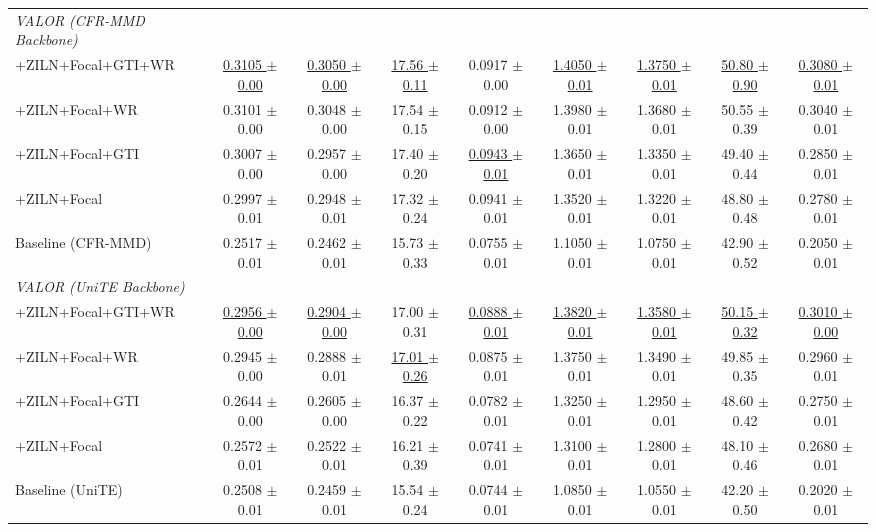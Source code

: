 \documentclass[runningheads]{llncs}
\begin{document}
\begin{table}[t]
{\begin{tabular}{lcccc|cccc}
    \textit{VALOR (CFR-MMD Backbone)} & & & & & & & & \\
    \hspace{3mm}+ZILN+Focal+GTI+WR & \underline{0.3105 $\pm$ 0.00} & \underline{0.3050 $\pm$ 0.00} & \underline{17.56 $\pm$ 0.11} & 0.0917 $\pm$ 0.00 & \underline{1.4050 $\pm$ 0.01} & \underline{1.3750 $\pm$ 0.01} & \underline{50.80 $\pm$ 0.90} & \underline{0.3080 $\pm$ 0.01} \\
    \hspace{3mm}+ZILN+Focal+WR & 0.3101 $\pm$ 0.00 & 0.3048 $\pm$ 0.00 & 17.54 $\pm$ 0.15 & 0.0912 $\pm$ 0.00 & 1.3980 $\pm$ 0.01 & 1.3680 $\pm$ 0.01 & 50.55 $\pm$ 0.39 & 0.3040 $\pm$ 0.01 \\
    \hspace{3mm}+ZILN+Focal+GTI & 0.3007 $\pm$ 0.00 & 0.2957 $\pm$ 0.00 & 17.40 $\pm$ 0.20 & \underline{0.0943 $\pm$ 0.01} & 1.3650 $\pm$ 0.01 & 1.3350 $\pm$ 0.01 & 49.40 $\pm$ 0.44 & 0.2850 $\pm$ 0.01 \\
    \hspace{3mm}+ZILN+Focal & 0.2997 $\pm$ 0.01 & 0.2948 $\pm$ 0.01 & 17.32 $\pm$ 0.24 & 0.0941 $\pm$ 0.01 & 1.3520 $\pm$ 0.01 & 1.3220 $\pm$ 0.01 & 48.80 $\pm$ 0.48 & 0.2780 $\pm$ 0.01 \\
    \hspace{3mm}Baseline (CFR-MMD) & 0.2517 $\pm$ 0.01 & 0.2462 $\pm$ 0.01 & 15.73 $\pm$ 0.33 & 0.0755 $\pm$ 0.01 & 1.1050 $\pm$ 0.01 & 1.0750 $\pm$ 0.01 & 42.90 $\pm$ 0.52 & 0.2050 $\pm$ 0.01 \\
    \midrule

    \textit{VALOR (UniTE Backbone)} & & & & & & & & \\
    \hspace{3mm}+ZILN+Focal+GTI+WR & \underline{0.2956 $\pm$ 0.00} & \underline{0.2904 $\pm$ 0.00} & 17.00 $\pm$ 0.31 & \underline{0.0888 $\pm$ 0.01} & \underline{1.3820 $\pm$ 0.01} & \underline{1.3580 $\pm$ 0.01} & \underline{50.15 $\pm$ 0.32} & \underline{0.3010 $\pm$ 0.00} \\
    \hspace{3mm}+ZILN+Focal+WR & 0.2945 $\pm$ 0.00 & 0.2888 $\pm$ 0.01 & \underline{17.01 $\pm$ 0.26} & 0.0875 $\pm$ 0.01 & 1.3750 $\pm$ 0.01 & 1.3490 $\pm$ 0.01 & 49.85 $\pm$ 0.35 & 0.2960 $\pm$ 0.01 \\
    \hspace{3mm}+ZILN+Focal+GTI & 0.2644 $\pm$ 0.00 & 0.2605 $\pm$ 0.00 & 16.37 $\pm$ 0.22 & 0.0782 $\pm$ 0.01 & 1.3250 $\pm$ 0.01 & 1.2950 $\pm$ 0.01 & 48.60 $\pm$ 0.42 & 0.2750 $\pm$ 0.01 \\
    \hspace{3mm}+ZILN+Focal & 0.2572 $\pm$ 0.01 & 0.2522 $\pm$ 0.01 & 16.21 $\pm$ 0.39 & 0.0741 $\pm$ 0.01 & 1.3100 $\pm$ 0.01 & 1.2800 $\pm$ 0.01 & 48.10 $\pm$ 0.46 & 0.2680 $\pm$ 0.01 \\
    \hspace{3mm}Baseline (UniTE) & 0.2508 $\pm$ 0.01 & 0.2459 $\pm$ 0.01 & 15.54 $\pm$ 0.24 & 0.0744 $\pm$ 0.01 & 1.0850 $\pm$ 0.01 & 1.0550 $\pm$ 0.01 & 42.20 $\pm$ 0.50 & 0.2020 $\pm$ 0.01 \\
    \midrule


\end{tabular}}
\end{table}
\end{document}
